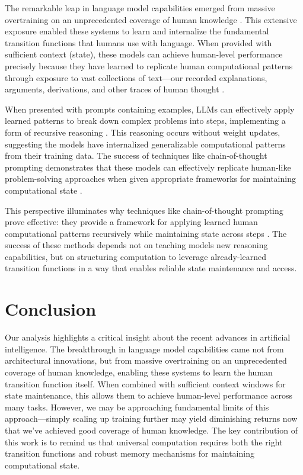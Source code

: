 \documentclass[12pt]{article}
\begin{document}
The remarkable leap in language model capabilities emerged from massive overtraining on an unprecedented coverage of human knowledge \cite{schuurmans2024autoregressive}.
This extensive exposure enabled these systems to learn and internalize the fundamental transition functions that humans use with language.
When provided with sufficient context (state), these models can achieve human-level performance precisely because they have learned to replicate human computational patterns through exposure to vast collections of text---our recorded explanations, arguments, derivations, and other traces of human thought \cite{brown2020language,wei2022chain}.

When presented with prompts containing examples, LLMs can effectively apply learned patterns to break down complex problems into steps, implementing a form of recursive reasoning \cite{wei2022chain}.
This reasoning occurs without weight updates, suggesting the models have internalized generalizable computational patterns from their training data.
The success of techniques like chain-of-thought prompting demonstrates that these models can effectively replicate human-like problem-solving approaches when given appropriate frameworks for maintaining computational state \cite{wei2022emergent}.

This perspective illuminates why techniques like chain-of-thought prompting prove effective: they provide a framework for applying learned human computational patterns recursively while maintaining state across steps \cite{wei2022chain}.
The success of these methods depends not on teaching models new reasoning capabilities, but on structuring computation to leverage already-learned transition functions in a way that enables reliable state maintenance and access.

\section{Conclusion}

Our analysis highlights a critical insight about the recent advances in artificial intelligence.
The breakthrough in language model capabilities came not from architectural innovations, but from massive overtraining on an unprecedented coverage of human knowledge, enabling these systems to learn the human transition function itself.
When combined with sufficient context windows for state maintenance, this allows them to achieve human-level performance across many tasks.
However, we may be approaching fundamental limits of this approach---simply scaling up training further may yield diminishing returns now that we've achieved good coverage of human knowledge.
The key contribution of this work is to remind us that universal computation requires both the right transition functions and robust memory mechanisms for maintaining computational state.
\end{document}
